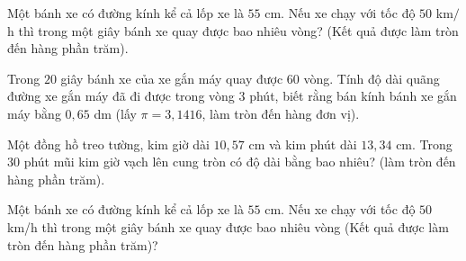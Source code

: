 \begin{ex}%
	Một bánh xe có đường kính kể cả lốp xe là $55$ cm. Nếu xe chạy với tốc độ $50$ km$/$h thì trong một giây bánh xe quay được bao  nhiêu vòng? (Kết quả được làm tròn đến hàng phần trăm).
\end{ex}

\begin{ex}%
	Trong $20$ giây bánh xe của xe gắn máy quay được $60$ vòng. Tính độ dài quãng đường xe gắn máy  đã đi được trong vòng $3$ phút, biết rằng bán kính bánh xe gắn máy bằng $0{,}65 $ dm (lấy $\pi=3{,}1416$, làm tròn đến hàng đơn vị).
\end{ex}

\begin{ex}%
	Một đồng hồ treo tường, kim giờ dài $10,57$ cm và kim phút dài $13,34$ cm. Trong $30$ phút mũi kim giờ vạch lên cung tròn có độ dài bằng  bao nhiêu? (làm tròn đến hàng phần trăm).
\end{ex}

\begin{ex}%
	Một bánh xe có đường kính kể cả lốp xe là $55$ cm. Nếu xe chạy với tốc độ $50$ km/h thì trong một giây bánh xe quay được  bao nhiêu vòng (Kết quả được làm tròn đến hàng phần trăm)?
\end{ex}


